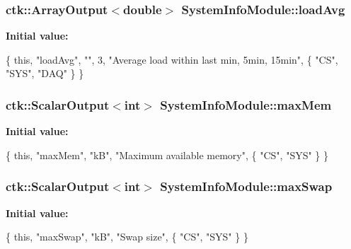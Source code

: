 \subsubsection[{\texorpdfstring{load\+Avg}{loadAvg}}]{\setlength{\rightskip}{0pt plus 5cm}ctk\+::\+Array\+Output$<$double$>$ System\+Info\+Module\+::load\+Avg}\hypertarget{classSystemInfoModule_a779eb35598aed3fa6a97383c6bf3d1e7}{}\label{classSystemInfoModule_a779eb35598aed3fa6a97383c6bf3d1e7}
{\bfseries Initial value\+:}
\begin{DoxyCode}
\{ \textcolor{keyword}{this}, \textcolor{stringliteral}{"loadAvg"}, \textcolor{stringliteral}{""}, 3, \textcolor{stringliteral}{"Average load within last min, 5min, 15min"},
    \{ \textcolor{stringliteral}{"CS"}, \textcolor{stringliteral}{"SYS"}, \textcolor{stringliteral}{"DAQ"} \} \}
\end{DoxyCode}
\subsubsection[{\texorpdfstring{max\+Mem}{maxMem}}]{\setlength{\rightskip}{0pt plus 5cm}ctk\+::\+Scalar\+Output$<$int$>$ System\+Info\+Module\+::max\+Mem}\hypertarget{classSystemInfoModule_a98edf6785e032deafe72a1e77b2be438}{}\label{classSystemInfoModule_a98edf6785e032deafe72a1e77b2be438}
{\bfseries Initial value\+:}
\begin{DoxyCode}
\{ \textcolor{keyword}{this}, \textcolor{stringliteral}{"maxMem"}, \textcolor{stringliteral}{"kB"},
      \textcolor{stringliteral}{"Maximum available memory"}, \{ \textcolor{stringliteral}{"CS"}, \textcolor{stringliteral}{"SYS"} \} \}
\end{DoxyCode}
\subsubsection[{\texorpdfstring{max\+Swap}{maxSwap}}]{\setlength{\rightskip}{0pt plus 5cm}ctk\+::\+Scalar\+Output$<$int$>$ System\+Info\+Module\+::max\+Swap}\hypertarget{classSystemInfoModule_a9eef2ed3d7ffb75ddcb2a0b5dc5b5ff2}{}\label{classSystemInfoModule_a9eef2ed3d7ffb75ddcb2a0b5dc5b5ff2}
{\bfseries Initial value\+:}
\begin{DoxyCode}
\{ \textcolor{keyword}{this}, \textcolor{stringliteral}{"maxSwap"}, \textcolor{stringliteral}{"kB"}, \textcolor{stringliteral}{"Swap size"},
    \{ \textcolor{stringliteral}{"CS"}, \textcolor{stringliteral}{"SYS"} \} \}
\end{DoxyCode}
